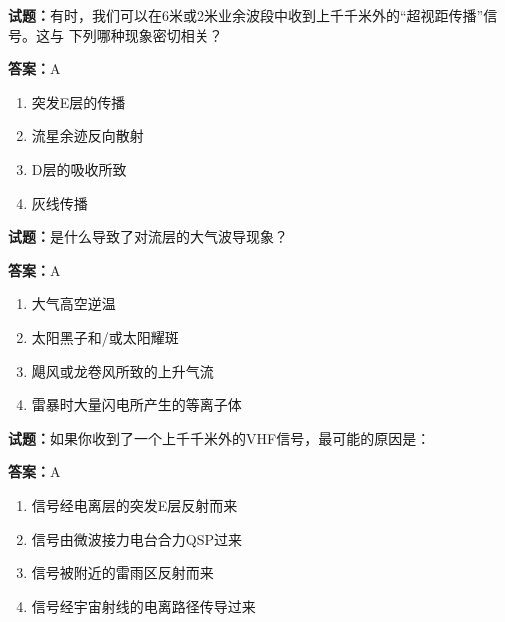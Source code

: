 \documentclass{ctexbook}
\begin{document}




\vspace{1em}

\textbf{试题：}有时，我们可以在6米或2米业余波段中收到上千千米外的“超视距传播”信号。这与
下列哪种现象密切相关？ 

\textbf{答案：}A 

\begin{enumerate}[leftmargin=3em]
  \item 突发E层的传播 

  \item 流星余迹反向散射 

  \item D层的吸收所致 

  \item 灰线传播 

\end{enumerate}





\vspace{1em}

\textbf{试题：}是什么导致了对流层的大气波导现象？ 

\textbf{答案：}A 

\begin{enumerate}[leftmargin=3em]
  \item 大气高空逆温 

  \item 太阳黑子和/或太阳耀斑 

  \item 飓风或龙卷风所致的上升气流 

  \item 雷暴时大量闪电所产生的等离子体 

\end{enumerate}





\vspace{1em}

\textbf{试题：}如果你收到了一个上千千米外的VHF信号，最可能的原因是： 

\textbf{答案：}A 

\begin{enumerate}[leftmargin=3em]
  \item 信号经电离层的突发E层反射而来 

  \item 信号由微波接力电台合力QSP过来 

  \item 信号被附近的雷雨区反射而来 

  \item 信号经宇宙射线的电离路径传导过来 

\end{enumerate}
\end{document}
